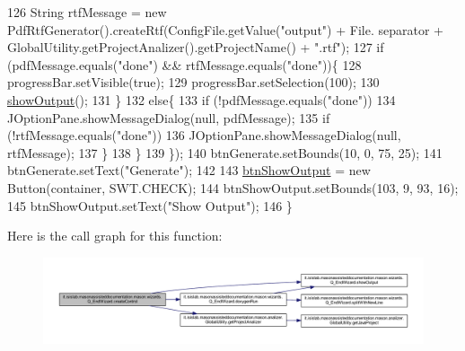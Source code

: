 \begin{DoxyCode}
126                 String rtfMessage = \textcolor{keyword}{new} PdfRtfGenerator().createRtf(ConfigFile.getValue(\textcolor{stringliteral}{"output"}) + File.
      separator + GlobalUtility.getProjectAnalizer().getProjectName() + \textcolor{stringliteral}{".rtf"});
127                 \textcolor{keywordflow}{if} (pdfMessage.equals(\textcolor{stringliteral}{"done"}) && rtfMessage.equals(\textcolor{stringliteral}{"done"}))\{
128                     progressBar.setVisible(\textcolor{keyword}{true});
129                     progressBar.setSelection(100);
130                     \hyperlink{classit_1_1isislab_1_1masonassisteddocumentation_1_1mason_1_1wizards_1_1_q___end_wizard_a4564b1098ec942795cbd022ccbe338e0}{showOutput}();
131                 \}
132                 \textcolor{keywordflow}{else}\{
133                     \textcolor{keywordflow}{if} (!pdfMessage.equals(\textcolor{stringliteral}{"done"}))
134                         JOptionPane.showMessageDialog(null, pdfMessage);
135                     \textcolor{keywordflow}{if} (!rtfMessage.equals(\textcolor{stringliteral}{"done"}))
136                         JOptionPane.showMessageDialog(null, rtfMessage);
137                 \}
138             \}
139         \});
140         btnGenerate.setBounds(10, 0, 75, 25);
141         btnGenerate.setText(\textcolor{stringliteral}{"Generate"});
142         
143         \hyperlink{classit_1_1isislab_1_1masonassisteddocumentation_1_1mason_1_1wizards_1_1_q___end_wizard_ae2da7cbfbfd8b618427f5d7fa356a8a5}{btnShowOutput} = \textcolor{keyword}{new} Button(container, SWT.CHECK);
144         btnShowOutput.setBounds(103, 9, 93, 16);
145         btnShowOutput.setText(\textcolor{stringliteral}{"Show Output"});
146     \}
\end{DoxyCode}


Here is the call graph for this function\-:
\nopagebreak
\begin{figure}[H]
\begin{center}
\leavevmode
\includegraphics[width=350pt]{classit_1_1isislab_1_1masonassisteddocumentation_1_1mason_1_1wizards_1_1_q___end_wizard_a3a0591b1e30644840d9828f5c67f8510_cgraph}
\end{center}
\end{figure}


